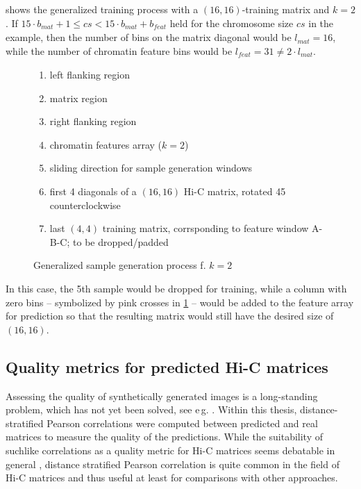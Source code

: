  shows the generalized training process with a $(16, 16)$-training matrix and $k=2$. 
If  $15\cdot b_\mathit{mat} + 1 \leq cs < 15\cdot b_\mathit{mat} + b_\mathit{feat}$ held for the chromosome size $cs$ in the example,
then the number of bins on the matrix diagonal would be $l_\mathit{mat}=16$, while the number of chromatin feature bins would be $l_\mathit{feat}=31 \not = 2 \cdot l_\mathit{mat}$.
\begin{figure}
 \begin{minipage}{0.65\textwidth}
    \caption{Generalized sample generation process f. $k=2$}
    \label{fig:methods:sample_gen_generalized}
 \end{minipage}\hfill
 \begin{minipage}{0.3\textwidth}
 \scriptsize
  \begin{enumerate}[label=\Alph*:,leftmargin=*]
   \raggedright
    \item left flanking region
    \item matrix region
    \item right flanking region
    \item chromatin features array ($k=2$)
    \item sliding direction for sample generation windows
    \item first 4 diagonals of a $(16, 16)$ Hi-C matrix, rotated \SI{45}{\deg} counterclockwise
    \item last $(4, 4)$ training matrix, corrsponding to feature window A-B-C; to be dropped/padded
\end{enumerate}
 \end{minipage}
\end{figure}
In this case, the 5th sample would be dropped for training,
while a column with zero bins -- symbolized by pink crosses in \cref{fig:methods:sample_gen_generalized} -- would be added to the feature array for prediction
so that the resulting matrix would still have the desired size of $(16, 16)$.

\subsection{Quality metrics for predicted Hi-C matrices} \label{sec:methods:metrics}
Assessing the quality of synthetically generated images is a long-standing problem, which has not yet been solved, see e\,g. \cite[p.\,19]{Wang2020}.
Within this thesis, distance-stratified Pearson correlations were computed between predicted and real matrices to measure the quality of the predictions.
While the suitability of suchlike correlations as a quality metric for Hi-C matrices seems debatable in general \cite{Yang2017}, 
distance stratified Pearson correlation is quite common in the field of Hi-C matrices and thus useful at least for comparisons with other approaches.

